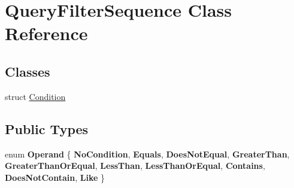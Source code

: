 \hypertarget{class_query_filter_sequence}{}\section{Query\+Filter\+Sequence Class Reference}
\label{class_query_filter_sequence}
\subsection*{Classes}
\begin{DoxyCompactItemize}
\item 
struct \hyperlink{struct_query_filter_sequence_1_1_condition}{Condition}
\end{DoxyCompactItemize}
\subsection*{Public Types}
\begin{DoxyCompactItemize}
\item 
\mbox{\label{class_query_filter_sequence_ab56d5a6f594eb822544fa32ff2b613c4}} 
enum {\bfseries Operand} \{ \newline
{\bfseries No\+Condition}, 
{\bfseries Equals}, 
{\bfseries Does\+Not\+Equal}, 
{\bfseries Greater\+Than}, 
\newline
{\bfseries Greater\+Than\+Or\+Equal}, 
{\bfseries Less\+Than}, 
{\bfseries Less\+Than\+Or\+Equal}, 
{\bfseries Contains}, 
\newline
{\bfseries Does\+Not\+Contain}, 
{\bfseries Like}
 \}
\end{DoxyCompactItemize}
